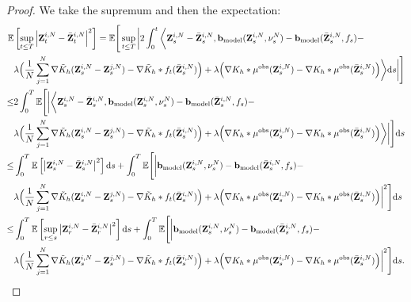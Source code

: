 \begin{proof}
We take the supremum and then the expectation:
\begin{equation}
\label{equ:prop_chaos}
\begin{aligned}
\mathbb E&\left[\sup_{t\leq T}\left|\mathbf{Z}^{i,N}_t-\bar{\mathbf{Z}}^{i,N}_t\right|^2\right] = \mathbb E\Bigg[\sup_{t\leq T} \bigg| 2 \int_0^t \bigg\langle \mathbf{Z}^{i,N}_s-\bar{\mathbf{Z}}^{i,N}_s, \mathbf{b}_\mathrm{model}(\mathbf{Z}^{i,N}_s,\nu_s^N) - \mathbf{b}_\mathrm{model}(\bar{\mathbf{Z}}^{i,N}_s, f_s) - \\
& \lambda \Big(\frac{1}{N}\sum_{j=1}^N \nabla \tilde  K_h(\mathbf{Z}^{i,N}_s - \mathbf{Z}^{j,N}_s) - \nabla\tilde{K}_h*f_t(\bar{\mathbf{Z}}^{i,N}_s)  \Big) + \lambda\Big(\nabla   K_h *\mu^{\mathrm{obs}} (\mathbf{Z}^{i,N}_s) - \nabla   K_h *\mu^{\mathrm{obs}} (\bar{\mathbf{Z}}^{i,N}_s)\Big)\bigg\rangle \mathrm{d} s \bigg| \Bigg] \\
\leq & 2 \int^T_0 \mathbb E \Bigg[ \bigg| \bigg\langle \mathbf{Z}^{i,N}_s-\bar{\mathbf{Z}}^{i,N}_s, \mathbf{b}_\mathrm{model}(\mathbf{Z}^{i,N}_s,\nu_s^N) - \mathbf{b}_\mathrm{model}(\bar{\mathbf{Z}}^{i,N}_s, f_s) -\\ & \lambda \Big(\frac{1}{N}\sum_{j=1}^N \nabla \tilde  K_h(\mathbf{Z}^{i,N}_s - \mathbf{Z}^{j,N}_s) - \nabla \tilde{K}_h *f_t(\bar{\mathbf{Z}}^{i,N}_s)  \Big) +\lambda\Big(\nabla   K_h *\mu^{\mathrm{obs}} (\mathbf{Z}^{i,N}_s) - \nabla   K_h *\mu^{\mathrm{obs}} (\bar{\mathbf{Z}}^{i,N}_s)\Big)\bigg\rangle\bigg|\Bigg] \mathrm{d} s\\
\leq &\int^T_0 \mathbb E \left[\left|\mathbf{Z}^{i,N}_s-\bar{\mathbf{Z}}^{i,N}_s\right|^2\right] \mathrm{d} s + \int^T_0 \mathbb E \Bigg[\bigg|\mathbf{b}_\mathrm{model}(\mathbf{Z}^{i,N}_s,\nu_s^N) - \mathbf{b}_\mathrm{model}(\bar{\mathbf{Z}}^{i,N}_s, f_s) -
\\&\lambda \Big(\frac{1}{N}\sum_{j=1}^N \nabla \tilde  K_h(\mathbf{Z}^{i,N}_s - \mathbf{Z}^{j,N}_s) - \nabla\tilde{K}_h *f_t(\bar{\mathbf{Z}}^{i,N}_s) \Big) +\lambda\Big(\nabla   K_h *\mu^{\mathrm{obs}} (\mathbf{Z}^{i,N}_s) - \nabla   K_h *\mu^{\mathrm{obs}} (\bar{\mathbf{Z}}^{i,N}_s)\Big)\bigg|^2\Bigg] \mathrm{d} s \\
\leq &\int^T_0 \mathbb E \left[\sup_{r\leq s} \left|\mathbf{Z}^{i,N}_r-\bar{\mathbf{Z}}^{i,N}_r\right|^2\right] \mathrm{d} s + \int^T_0 \mathbb E \Bigg[\bigg|\mathbf{b}_\mathrm{model}(\mathbf{Z}^{i,N}_s,\nu_s^N) - \mathbf{b}_\mathrm{model}(\bar{\mathbf{Z}}^{i,N}_s, f_s) -
\\&\lambda \Big(\frac{1}{N}\sum_{j=1}^N \nabla \tilde  K_h(\mathbf{Z}^{i,N}_s - \mathbf{Z}^{j,N}_s) - \nabla\tilde{K}_h*f_t(\bar{\mathbf{Z}}^{i,N}_s)  \Big) +\lambda\Big(\nabla   K_h *\mu^{\mathrm{obs}} (\mathbf{Z}^{i,N}_s) - \nabla   K_h *\mu^{\mathrm{obs}} (\bar{\mathbf{Z}}^{i,N}_s)\Big)\bigg|^2\Bigg] \mathrm{d} s. 
\end{aligned}
\end{equation}


\end{proof}
